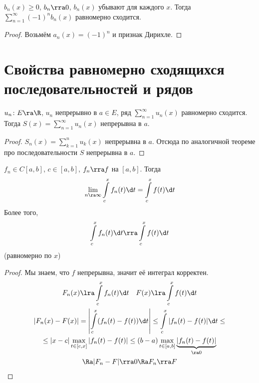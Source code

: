 \begin{theorem}
	$b_n(x) \ge 0$, $b_n \rra 0$, $b_n(x)$ убывают для каждого $x$.
	Тогда $\sum_{n=1}^\infty (-1)^n b_n(x)$ равномерно сходится.
\end{theorem}
\begin{proof}
	Возьмём $a_n(x) = (-1)^n$ и признак Дирихле.
\end{proof}

\section[Св-ва равномерно сход-ся посл-тей и рядов]{Свойства равномерно сходящихся последовательностей и рядов}

\begin{theorem}
	$u_n\colon E \ra \R$, $u_n$ непрерывно в $a \in E$, ряд $\sum_{n=1}^\infty u_n(x)$ равномерно сходится.
	Тогда $S(x) = \sum_{n=1}^\infty u_n(x)$ непрерывна в $a$.
\end{theorem}
\begin{proof}
	$S_n(x) = \sum_{k=1}^n u_k(x)$ непрерывна в $a$.
	Отсюда по аналогичной теореме про последовательности $S$ непрерывна в $a$.
\end{proof}

\begin{theorem}
	$f_n \in C[a,b]$, $c \in [a,b]$, $f_n \rra f$ на $[a, b]$.
	Тогда
	\[ \lim_{n \ra \infty} \int\limits_c^x f_n(t) \d t = \int\limits_c^x f(t) \d t \]
	Более того,
	\[ \int\limits_c^x f_n(t) \d t \rra \int\limits_c^x f(t) \d t \]
	(равномерно по $x$)
\end{theorem}
\begin{proof}
	Мы знаем, что $f$ непрерывна, значит её интеграл корректен.
	\begin{gather*}
		F_n(x) \lra \int\limits_c^x f_n(t) \d t \quad F(x) \lra \int\limits_c^x f(t) \d t \\
		\left| F_n(x) - F(x) \right|
		= \left| \int\limits_c^x (f_n(t) - f(t)) \d t \right|
		\le \int\limits_c^x |f_n(t) - f(t)| \d t \le \\
		\le |x - c| \max_{t \in [c,x]} |f_n(t) - f(t)|
		\le (b - a) \max_{t \in [a,b]} \underbrace{|f_n(t) - f(t)|}_{\ra 0} \\
		\Ra |F_n - F| \rra 0
		\Ra F_n \rra F
	\end{gather*}
\end{proof}

